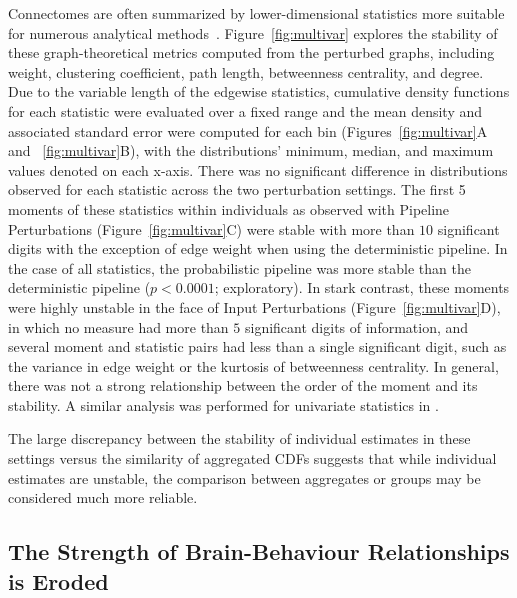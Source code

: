 \documentclass[fleqn,10pt]{SelfArx} %
\begin{document}
Connectomes are often summarized by lower-dimensional statistics more suitable for numerous analytical
methods~\cite{Rubinov2010-fh}. Figure~\ref{fig:multivar} explores the stability of these graph-theoretical metrics
computed from the perturbed graphs, including weight, clustering coefficient, path length, betweenness centrality, and
degree. Due to the variable length of the edgewise statistics, cumulative density functions for each statistic were
evaluated over a fixed range and the mean density and associated standard error were computed for each bin
(Figures~\ref{fig:multivar}A and ~\ref{fig:multivar}B), with the distributions' minimum, median, and maximum values
denoted on each x-axis. There was no significant difference in distributions observed for each statistic across the two
perturbation settings. The first 5 moments of these statistics within individuals as observed with Pipeline
Perturbations (Figure~\ref{fig:multivar}C) were stable with more than $10$ significant digits with the exception of
edge weight when using the deterministic pipeline. In the case of all statistics, the probabilistic pipeline was more
stable than the deterministic pipeline ($p < 0.0001$; exploratory). In stark contrast, these moments were highly
unstable in the face of Input Perturbations (Figure~\ref{fig:multivar}D), in which no measure had more than $5$
significant digits of information, and several moment and statistic pairs had less than a single significant digit,
such as the variance in edge weight or the kurtosis of betweenness centrality. In general, there was not a strong
relationship between the order of the moment and its stability. A similar analysis was performed for univariate
statistics in .

The large discrepancy between the stability of individual estimates in these settings versus the similarity of
aggregated CDFs suggests that while individual estimates are unstable, the comparison between aggregates or groups may
be considered much more reliable.

\subsection*{The Strength of Brain-Behaviour Relationships is Eroded}
\end{document}
